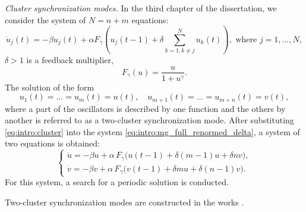 \textit{Cluster synchronization modes.} 
In the third chapter of the dissertation, we consider the system of $N = n + m$ equations:
\begin{equation}
	\label{eq:intro:mg_full_renormed_delta}
	\dot{u}_j(t) = -\beta u_j(t) + \alpha F_{\gamma} \left(u_j(t - 1) + \delta\sum\limits_{k = 1, k\neq j}^N u_k(t)\right), \text{ where } j = 1, \dots, N,
\end{equation}
$\delta > 1$ is a feedback multiplier, 
\[
F_{\gamma}(u) = \dfrac{u}{1 + u^{\gamma}}.
\]
The solution of the form
\begin{equation}
	\label{eq:intro:cluster}
	u_1(t)=\ldots=u_m(t) = u(t),\quad u_{m+1}(t)=\ldots=u_{m+n}(t) = v(t),
\end{equation}
where a part of the oscillators is described by one function and the others by another is referred to as a two-cluster synchronization mode. After substituting \eqref{eq:intro:cluster} into the system \eqref{eq:intro:mg_full_renormed_delta}, a system of two equations is obtained:
%
\begin{equation}
	\label{eq:intro:system_uv}
	\begin{cases}
		\dot{u} = -\beta u + \alpha \, F_{\gamma} \big(u(t - 1) + \delta (m - 1) u + \delta n v\big),\\
		\dot{v} = -\beta v + \alpha \, F_{\gamma} \big(v(t - 1) + \delta m u + \delta (n - 1) v\big).
	\end{cases}
\end{equation}
%
For this system, a search for a periodic solution is conducted.

Two-cluster synchronization modes are constructed in the works \cite{Glyzin2016a, Glyzin2022}.

